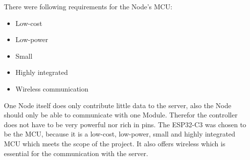 There were following requirements for the Node's MCU:
\begin{itemize}
    \item Low-cost
    \item Low-power
    \item Small
    \item Highly integrated
    \item Wireless communication
\end{itemize}

One Node itself does only contribute little data to the server, also the Node 
should only be able to communicate with one Module. Therefor the controller 
does not have to be very powerful nor rich in pins. The ESP32-C3 was chosen to 
be the MCU, because it is a low-cost, low-power, small and highly integrated MCU 
which meets the scope of the project. It also offers wireless which is essential
for the communication with the server.


